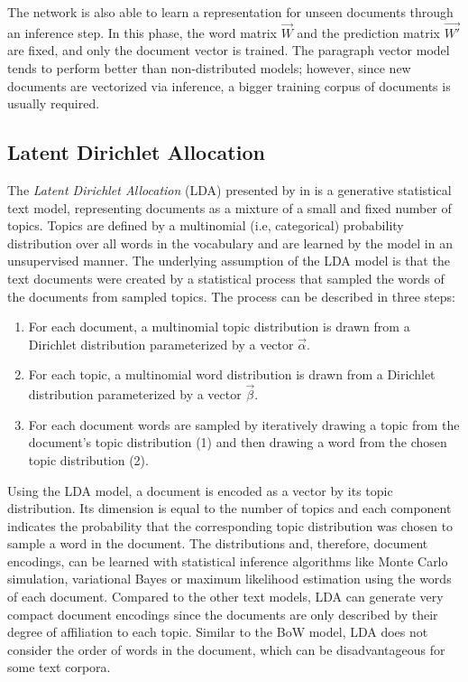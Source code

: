 The network is also able to learn a representation for unseen documents through an inference step.
In this phase, the word matrix $\vec{W}$ and the prediction matrix $\vec{W'}$ are fixed, and only the document vector is trained.
The paragraph vector model tends to perform better than non-distributed models; however, since new documents are vectorized via inference, a bigger training corpus of documents is usually required.

\subsection{Latent Dirichlet Allocation}\label{sec:lda}

The \textit{Latent Dirichlet Allocation} (LDA) presented by \citeauthor{DBLP:journals/jmlr/BleiNJ03} in \citeyear{DBLP:journals/jmlr/BleiNJ03} \cite{DBLP:journals/jmlr/BleiNJ03} is a generative statistical text model, representing documents as a mixture of a small and fixed number of topics.
Topics are defined by a multinomial (i.e, categorical) probability distribution over all words in the vocabulary and are learned by the model in an unsupervised manner.
The underlying assumption of the LDA model is that the text documents were created by a statistical process that sampled the words of the documents from sampled topics.
The process can be described in three steps:
\begin{enumerate}
	\item For each document, a multinomial topic distribution is drawn from a Dirichlet distribution parameterized by a vector $\vec{\alpha}$.
	\item For each topic, a multinomial word distribution is drawn from a Dirichlet distribution parameterized by a vector $\vec{\beta}$.
	\item For each document words are sampled by iteratively drawing a topic from the document’s topic distribution (1) and then drawing a word from the chosen topic distribution (2).
\end{enumerate}
Using the LDA model, a document is encoded as a vector by its topic distribution.
Its dimension is equal to the number of topics and each component indicates the probability that the corresponding topic distribution was chosen to sample a word in the document.
The distributions and, therefore, document encodings, can be learned with statistical inference algorithms like Monte Carlo simulation, variational Bayes or maximum likelihood estimation using the words of each document.
Compared to the other text models, LDA can generate very compact document encodings since the documents are only described by their degree of affiliation to each topic.
Similar to the BoW model, LDA does not consider the order of words in the document, which can be disadvantageous for some text corpora.

